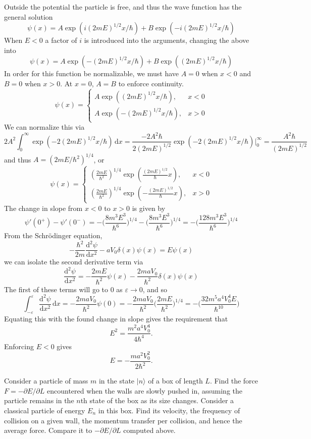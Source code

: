 \documentclass[../principles-of-quantum-mechanics.tex]{subfiles}
\begin{document}
\begin{questions}
	\begin{solution}
		Outside the potential the particle is free, and thus the wave function has the general solution
		$$\psi(x) = A\exp(i(2mE)^{1/2}x/\hbar) + B\exp(-i(2mE)^{1/2}x/\hbar)$$
		When $E<0$ a factor of $i$ is introduced into the arguments, changing the above into
		$$\psi(x) = A\exp(-(2mE)^{1/2}x/\hbar) + B\exp((2mE)^{1/2}x/\hbar)$$
		In order for this function be normalizable, we must have $A = 0$ when $x < 0$ and $B = 0$ when $x > 0$. At $x = 0$, $A = B$ to enforce continuity.
		$$\psi(x) = \begin{cases}A\exp((2mE)^{1/2}x/\hbar), &x < 0 \\ A\exp(-(2mE)^{1/2}x/\hbar), &x > 0\end{cases}$$
		We can normalize this via
		$$2A^2\int_{0}^{\infty}\exp(-2(2mE)^{1/2}x/\hbar)\,\mathrm{d}x = \frac{-2A^2\hbar}{2(2mE)^{1/2}}\exp(-2(2mE)^{1/2}x/\hbar)\Big|_{0}^{\infty} = \frac{A^2\hbar}{(2mE)^{1/2}}$$
		and thus $A = (2mE/\hbar^2)^{1/4}$, or
		$$\psi(x) = \begin{cases}(\frac{2mE}{\hbar^2})^{1/4}\exp({\frac{(2mE)^{1/2}}{\hbar}x}), &x < 0 \\ (\frac{2mE}{\hbar^2})^{1/4}\exp(-\frac{(2mE)^{1/2}}{\hbar}x), &x > 0\end{cases}$$
		The change in slope from $x<0$ to $x>0$ is given by
		$$\psi'(0^+) - \psi'(0^-) = -\Big(\frac{8m^3E^3}{\hbar^6}\Big)^{1/4} - \Big(\frac{8m^3E^3}{\hbar^6}\Big)^{1/4} = -\Big(\frac{128m^3E^3}{\hbar^6}\Big)^{1/4}$$
		From the Schr\"odinger equation,
		$$-\frac{\hbar^2}{2m}\frac{\mathrm{d}^2\psi}{\mathrm{d}x^2} - aV_0\delta(x)\psi(x) = E\psi(x)$$
		we can isolate the second derivative term via
		$$\frac{\mathrm{d}^2\psi}{\mathrm{d}x^2} = -\frac{2mE}{\hbar^2}\psi(x) - \frac{2maV_0}{\hbar^2}\delta(x)\psi(x)$$
		The first of these terms will go to $0$ as $\varepsilon\to0$, and so
		$$\int_{-\varepsilon}^{\varepsilon}\frac{\mathrm{d}^2\psi}{\mathrm{d}x^2}\,\mathrm{d}x = -\frac{2maV_0}{\hbar^2}\psi(0) = -\frac{2maV_0}{\hbar^2}\Big(\frac{2mE}{\hbar^2}\Big)^{1/4} = -\Big(\frac{32m^5a^4V_0^4E}{\hbar^{10}}\Big)$$
		Equating this with the found change in slope gives the requirement that 
		$$E^2 = \frac{m^2a^4V_0^4}{4\hbar^4}.$$
		Enforcing $E<0$ gives
		$$E = -\frac{ma^2V_0^2}{2\hbar^2}.$$
	\end{solution}
	
	\question Consider a particle of mass $m$ in the state $|n\rangle$ of a box of length $L$. Find the force $F = -\partial E / \partial L$ encountered when the walls are slowly pushed in, assuming the particle remains in the $n$th state of the box as its size changes. Consider a classical particle of energy $E_n$ in this box. Find its velocity, the frequency of collision on a given wall, the momentum transfer per collision, and hence the average force. Compare it to $-\partial E / \partial L$ computed above.
	

\end{questions}
\end{document}
